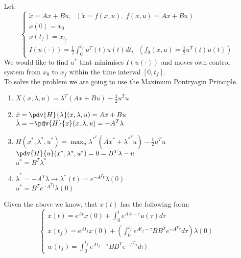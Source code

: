 {
    Let:
    \begin{equation}
        \begin{cases}
            \dot{x} = Ax +Bu,\;\; (\dot{x}=f(x,u),\; f(x,u)=Ax+Bu)\\
            x(0) = x_0\\
            x(t_f) = x_{t_f}\\
            I(u(\cdot)) = \frac{1}{2}\int^{t_f}_0 u^{T}(t)u(t)dt ,\;\; (f_0(x,u) = \frac{1}{2}u^{T}(t)u(t))
        \end{cases}
    \end{equation}
    We would like to find $u^{*}$ that minimises $I(u(\cdot))$ and moves own control system from  $x_0$ to $x_f$ within the time interval $[0,t_f]$.\\
    To solve the problem we are going to use the Maximum Pontryagin Principle.

    \begin{enumerate}
        \item $X(x,\lambda,u) = \lambda^{T}(Ax+Bu) - \frac{1}{2}u^{T}u$\\
        \item $\dot{x} = \pdv{H}{\lambda}(x,\lambda,u) = Ax+Bu $\\
            $\dot{\lambda} = - \pdv{H}{x}(x,\lambda,u) = -A^{T}\lambda$
        \item $H(x^{*},\lambda^{*},u^{*}) = \max_u{\lambda^{*^{T}}(Ax^{*}+\lambda^{*^{T}}u)-\frac{1}{2}u^{T}u} $\\
            $ \pdv{H}{u}(x^{*},\lambda^{*},u^{*}) = 0 = B^{T}\lambda - u$ \\
            $u^{*} = B^{T}\lambda^{*}$

        \item $\dot{\lambda}^{*} = - A^{T}\lambda \rightarrow \lambda^{*}(t) = e^{-A^{T}t}\lambda(0)$ \\
            $u^{*} = B^{T}e^{-A^{T}t}\lambda(0)$
    \end{enumerate}
 
    Given the above we know, that $x(t)$ has the following form:
    \begin{equation}
        \begin{cases}
        x(t) = e^{At}x(0) + \int_0^{t}e^{A(t-\tau}u(\tau)d\tau\\
        x(t_f) = e^{At_f}x(0) +(\int_0^{t_f}e^{At_f-\tau}BB^{T}e^{-A^{T}\tau}d\tau)\lambda(0)\\
        w(t_f) = \int_0^{t_f}e^{At_f-\tau}BB^{T}e^{-A^{T}\tau}d\tau)\
        \end{cases}


\end{equation}}

